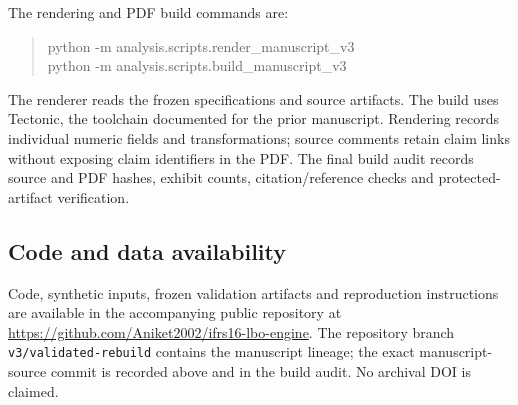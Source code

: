\documentclass[11pt,a4paper]{article}
\begin{document}
The rendering and PDF build commands are:
\begin{quote}\small\ttfamily
python -m analysis.scripts.render\_manuscript\_v3\\
python -m analysis.scripts.build\_manuscript\_v3
\end{quote}
The renderer reads the frozen specifications and source artifacts. The build uses Tectonic, the toolchain documented for the prior manuscript. Rendering records individual numeric fields and transformations; source comments retain claim links without exposing claim identifiers in the PDF. The final build audit records source and PDF hashes, exhibit counts, citation/reference checks and protected-artifact verification.

\subsection{Code and data availability}
Code, synthetic inputs, frozen validation artifacts and reproduction instructions are available in the accompanying public repository at \url{https://github.com/Aniket2002/ifrs16-lbo-engine}. The repository branch \texttt{v3/validated-rebuild} contains the manuscript lineage; the exact manuscript-source commit is recorded above and in the build audit. No archival DOI is claimed.
\end{document}
